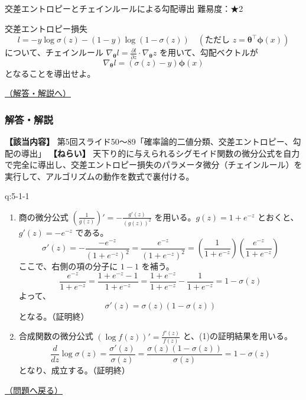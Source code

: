 \begin{questionbox}[label=q:5-1-2]{交差エントロピーとチェインルールによる勾配導出 \hfill \normalfont \small 難易度：★2}

交差エントロピー損失 \[
l = -y \log \sigma(z) - (1-y) \log(1 - \sigma(z)) \quad (\text{ただし } z = \boldsymbol{\theta}^\top \boldsymbol{\phi}(x))
\] について、チェインルール
\(\nabla_{\boldsymbol{\theta}} l = \frac{\partial l}{\partial z} \cdot \nabla_{\boldsymbol{\theta}} z\)
を用いて、勾配ベクトルが \[
\nabla_{\boldsymbol{\theta}} l = (\sigma(z) - y)\boldsymbol{\phi}(x)
\] となることを導出せよ。

\hfill 

\hyperref[a:5-1-2]{（解答・解説へ）}

\end{questionbox}

\subsubsection{解答・解説}\label{ux89e3ux7b54ux89e3ux8aac-12}

\textbf{【該当内容】}
第5回スライド50〜89「確率論的二値分類、交差エントロピー、勾配の導出」
\textbf{【ねらい】}
天下り的に与えられるシグモイド関数の微分公式を自力で完全に導出し、交差エントロピー損失のパラメータ微分（チェインルール）を実行して、アルゴリズムの動作を数式で裏付ける。

\begin{answerbox}[phantomlabel=a:5-1-1]{q:5-1-1}

\begin{enumerate}
\def\labelenumi{\arabic{enumi}.}
\tightlist
\item
  商の微分公式
  \(\left( \frac{1}{g(z)} \right)' = -\frac{g'(z)}{(g(z))^2}\)
  を用いる。\(g(z) = 1 + e^{-z}\) とおくと、\(g'(z) = -e^{-z}\) である。
  \[
       \sigma'(z) = - \frac{-e^{-z}}{(1 + e^{-z})^2} = \frac{e^{-z}}{(1 + e^{-z})^2} = \left( \frac{1}{1 + e^{-z}} \right) \left( \frac{e^{-z}}{1 + e^{-z}} \right)
       \] ここで、右側の項の分子に \(1 - 1\) を補う。 \[
       \frac{e^{-z}}{1 + e^{-z}} = \frac{1 + e^{-z} - 1}{1 + e^{-z}} = \frac{1 + e^{-z}}{1 + e^{-z}} - \frac{1}{1 + e^{-z}} = 1 - \sigma(z)
       \] よって、 \[
       \sigma'(z) = \sigma(z)(1 - \sigma(z))
       \] となる。（証明終）
\item
  合成関数の微分公式 \((\log f(z))' = \frac{f'(z)}{f(z)}\)
  と、(1)の証明結果を用いる。 \[
       \frac{d}{dz} \log \sigma(z) = \frac{\sigma'(z)}{\sigma(z)} = \frac{\sigma(z)(1 - \sigma(z))}{\sigma(z)} = 1 - \sigma(z)
       \] となり、成立する。（証明終）
\end{enumerate}

\hfill 

\hyperref[q:5-1-1]{（問題へ戻る）}

\end{answerbox}

